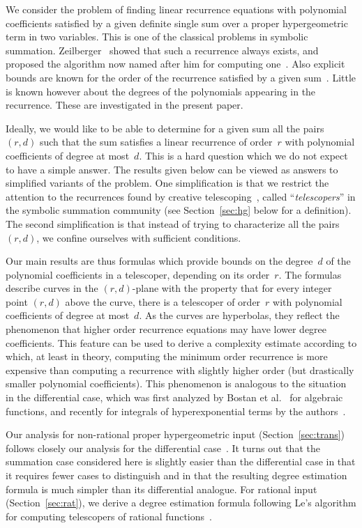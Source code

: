 \documentclass{sig-alternate}
\begin{document}
We consider the problem of finding linear recurrence equations with polynomial
coefficients satisfied by a given definite single sum over a proper
hypergeometric term in two variables. This is one of the classical problems
in symbolic summation. Zeilberger~\cite{zeilberger90} showed that such a
recurrence always exists, and proposed the algorithm now named after him for
computing one~\cite{zeilberger90a,zeilberger91}. Also explicit bounds are known
for the order of the recurrence satisfied by a given
sum~\cite{wilf92a,mohammed05,bostan10}. Little is known however about the
degrees of the polynomials appearing in the recurrence. These are investigated
in the present paper.

Ideally, we would like to be able to determine for a given sum all the pairs
$(r,d)$ such that the sum satisfies a linear recurrence of order~$r$ with
polynomial coefficients of degree at most~$d$. This is a hard question which we
do not expect to have a simple answer. The results given below can be viewed as
answers to simplified variants of the problem. One simplification is that we
restrict the attention to the recurrences found by creative
telescoping~\cite{zeilberger91}, called ``\emph{telescopers}'' in the symbolic summation
community (see Section~\ref{sec:hg} below for a definition). The second
simplification is that instead of trying to characterize all the pairs $(r,d)$,
we confine ourselves with sufficient conditions.

Our main results are thus formulas which provide bounds on the degree~$d$
of the polynomial coefficients in a telescoper, depending on its order~$r$. The
formulas describe curves in the $(r,d)$-plane with the property that for every
integer point $(r,d)$ above the curve, there is a telescoper of order~$r$ with
polynomial coefficients of degree at most~$d$. As the curves are hyperbolas,
they reflect the phenomenon that higher order recurrence equations may have
lower degree coefficients. This feature can be used to derive a complexity
estimate according to which, at least in theory, computing the minimum order
recurrence is more expensive than computing a recurrence with slightly higher
order (but drastically smaller polynomial coefficients). This phenomenon is
analogous to the situation in the differential case, which was first analyzed by
Bostan et al.~\cite{bostan07} for algebraic functions, and recently for
integrals of hyperexponential terms by the authors~\cite{chen11}.

Our analysis for non-rational proper hypergeometric input
(Section~\ref{sec:trans}) follows closely our analysis for the differential
case~\cite{chen11}. It turns out that the summation case considered here is
slightly easier than the differential case in that it requires fewer cases to
distinguish and in that the resulting degree estimation formula is much simpler
than its differential analogue. For rational input (Section~\ref{sec:rat}), we
derive a degree estimation formula following Le's algorithm for computing
telescopers of rational functions~\cite{abramov02,le03}.
\end{document}
